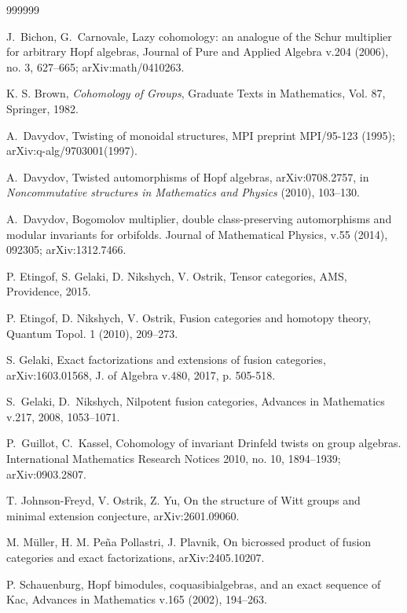 \documentclass[12pt]{amsart}
\numberwithin{equation}{section}
\theoremstyle{definition}
\newcommand{\1}{_{(1)}}
\newcommand{\2}{_{(2)}}
\newcommand{\3}{_{(3)}}
\newcommand{\4}{_{(4)}}
\newcommand{\5}{_{(5)}}
\newcommand{\6}{_{(6)}}
\theoremstyle{plain}
\theoremstyle{definition}
\theoremstyle{remark}
\begin{document}
\begin{thebibliography}{999999}

 J.~Bichon, G.~Carnovale, Lazy cohomology: an analogue of the Schur multiplier for arbitrary Hopf algebras,
Journal of Pure and Applied Algebra v.204 (2006), no. 3, 627--665; arXiv:math/0410263.

 K. S. Brown, \emph{Cohomology of Groups}, Graduate Texts in Mathematics, Vol. 87, Springer, 1982.

  A.~Davydov, Twisting of monoidal structures,  MPI preprint MPI/95-123 (1995); arXiv:q-alg/9703001(1997). 

  A.~Davydov,  Twisted automorphisms of Hopf algebras, 	arXiv:0708.2757,   in {\em Noncommutative structures in Mathematics and Physics} (2010), 103--130.

  A.~Davydov, Bogomolov multiplier, double class-preserving automorphisms and modular invariants for orbifolds.
Journal of Mathematical Physics,  v.55 (2014), 092305; arXiv:1312.7466.

 P. Etingof, S. Gelaki, D. Nikshych, V. Ostrik, Tensor categories, AMS, Providence, 2015. 

 P. Etingof, D. Nikshych, V. Ostrik, Fusion categories and homotopy theory, Quantum Topol. 1 (2010), 209--273.

 S. Gelaki, Exact factorizations and extensions of fusion categories, arXiv:1603.01568, J. of Algebra v.480, 2017, p. 505-518.

 S.~Gelaki, D.~Nikshych, Nilpotent fusion categories, Advances in Mathematics v.217, 2008, 1053--1071.

 P.~Guillot, C.~Kassel, Cohomology of invariant Drinfeld twists on group algebras.
International Mathematics Research Notices 2010, no. 10, 1894–1939; arXiv:0903.2807.

 T. Johnson-Freyd, V. Ostrik, Z. Yu, 
On the structure of Witt groups and minimal extension conjecture, arXiv:2601.09060.

 M. M\"uller, H. M. Pe\~na Pollastri, J. Plavnik, On bicrossed product of fusion categories and exact factorizations, arXiv:2405.10207.

 P. Schauenburg, Hopf bimodules, coquasibialgebras, and an exact sequence of Kac, Advances in Mathematics v.165 (2002), 194--263.

\end{thebibliography}
\end{document}
